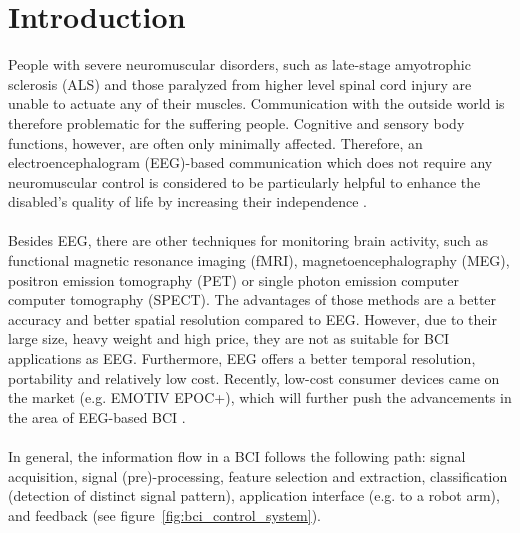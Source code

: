 \documentclass[a4paper,oneside, openright,12pt]{report}
\begin{document}
\chapter{Introduction}
People with severe neuromuscular disorders, such as late-stage amyotrophic sclerosis (ALS) and those paralyzed from higher level spinal cord injury are unable to actuate any of their muscles. Communication with the outside world is therefore problematic for the suffering people. Cognitive and sensory body functions, however, are often only minimally affected. Therefore, an electroencephalogram (EEG)-based communication which does not require any neuromuscular control is considered to be particularly helpful to enhance the disabled's quality of life by increasing their independence \cite{birbaumer2006brain}.\\\\
Besides EEG, there are other techniques for monitoring brain activity, such as functional magnetic resonance imaging (fMRI), magnetoencephalography (MEG), positron emission tomography (PET) or single photon emission computer computer tomography (SPECT). The advantages of those methods are a better accuracy and better spatial resolution compared to EEG. However, due to their large size, heavy weight and high price, they are not as suitable for BCI applications as EEG. Furthermore, EEG offers a better temporal resolution, portability and relatively low cost. Recently, low-cost consumer devices came on the market (e.g. EMOTIV EPOC+), which will further push the advancements in the area of EEG-based BCI \cite{sivakamianalysis}. \\\\
In general, the information flow in a BCI follows the following path: signal acquisition, signal (pre)-processing, feature selection and extraction, classification (detection of distinct signal pattern), application interface (e.g. to a robot arm), and feedback (see figure~\ref{fig:bci_control_system}). 
\end{document}
